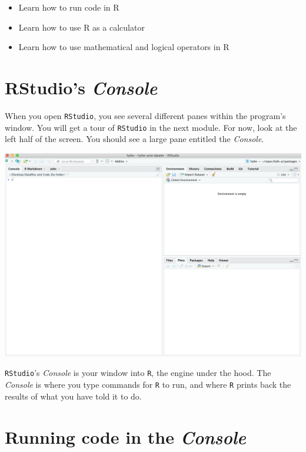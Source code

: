 \documentclass[
]{book}
\providecommand{\tightlist}{%
  \setlength{\itemsep}{0pt}\setlength{\parskip}{0pt}}
\begin{document}
\begin{itemize}
\tightlist
\item
  Learn how to run code in R
\item
  Learn how to use R as a calculator
\item
  Learn how to use mathematical and logical operators in R
\end{itemize}

\hypertarget{rstudios-console}{%
\section*{\texorpdfstring{RStudio's \emph{Console}}{RStudio's Console}}\label{rstudios-console}}

When you open \texttt{RStudio}, you see several different panes within the program's window. You will get a tour of \texttt{RStudio} in the next module. For now, look at the left half of the screen. You should see a large pane entitled the \emph{Console}.

\includegraphics{img/rstudio_firstopen.png}

\texttt{RStudio}'s \emph{Console} is your window into \texttt{R}, the engine under the hood. The \emph{Console} is where you type commands for \texttt{R} to run, and where \texttt{R} prints back the results of what you have told it to do.

\hypertarget{running-code-in-the-console}{%
\section*{\texorpdfstring{Running code in the \emph{Console}}{Running code in the Console}}\label{running-code-in-the-console}}
\end{document}
